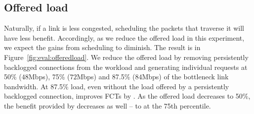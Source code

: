 

\subsection{Offered load}\label{s:eval:offeredload}
Naturally, if a link is less congested, scheduling the packets that traverse it will have less benefit. Accordingly, as we reduce the offered load in this experiment, we expect the gains from scheduling to diminish. The result is in Figure~\ref{fig:eval:offeredload}. We reduce the offered load by removing persistently backlogged connections from the workload and generating individual requests at 50\% ($48$Mbps), 75\% ($72$Mbps) and 87.5\% ($84$Mbps) of the bottleneck link bandwidth.
At 87.5\% load, even without the load offered by a persistently backlogged connection, \name improves FCTs by . 
As the offered load decreases to 50\%, the benefit provided by \name decreases as well -- to  at the 75th percentile.


